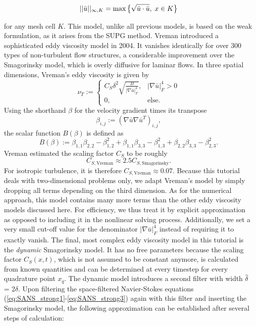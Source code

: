 \documentclass[a4paper, 11pt, twoside]{article}
\begin{document}
\begin{equation}
    ||\bar{u}||_{\infty,K} = \max\big\{\sqrt{\bar{u} \cdot \bar{u}}, \hspace{0.1cm} x \in K\big\}
\end{equation} 

for any mesh cell $K$. This model, unlike all previous models, is based on the weak formulation, as it arises from the SUPG method. Vreman \cite{Vreman} introduced a sophisticated eddy viscosity model in 2004. It vanishes identically for over 300 types of non-turbulent flow structures, a considerable improvement over the Smagorinsky model, which is overly diffusive for laminar flows. In three spatial dimensions, Vreman's eddy viscosity is given by \begin{equation}
    \label{eq:Vreman}
    \nu_T := \begin{cases}
    C_S \delta^2 \sqrt{\frac{B}{|\nabla \bar{u}|_F^4}}, & |\nabla \bar{u}|_F^4 > 0 \\
    0, & \text{else}.
    \end{cases}
\end{equation} Using the shorthand $\beta$ for the velocity gradient times its transpose \begin{equation}
    \beta_{i,j} := (\nabla \bar{u} \nabla \bar{u}^T)_{i,j}, 
\end{equation} the scalar function $B(\beta)$ is defined as \begin{equation}
    B(\beta) := \beta_{1,1}\beta_{2,2} - \beta_{1,2}^2 + \beta_{1,1}\beta_{3,3} - \beta_{1,3}^2 + \beta_{2,2}\beta_{3,3} - \beta_{2,3}^2.
\end{equation} Vreman estimated the scaling factor $C_S$ to be roughly \begin{equation}
    C_{S, \text{Vreman}} \approx 2.5 C_{S, \text{Smagorinsky}}.
\end{equation} For isotropic turbulence, it is therefore $C_{S, \text{Vreman}} \approx 0.07$. Because this tutorial deals with two-dimensional problems only, we adapt Vreman's model by simply dropping all terms depending on the third dimension. As for the numerical approach, this model contains many more terms than the other eddy viscosity models discussed here. For efficiency, we thus treat it by explicit approximation as opposed to including it in the nonlinear solving process. Additionally, we set a very small cut-off value for the denominator $|\nabla \bar{u}|_F^4$ instead of requiring it to exactly vanish. The final, most complex eddy viscosity model in this tutorial is the \textit{dynamic} Smagorinsky model. It has no free parameters because the scaling factor $C_S(x,t)$, which is not assumed to be constant anymore, is calculated from known quantities and can be determined at every timestep for every quadrature point $x_q$. The dynamic model introduces a second filter with width $\hat{\delta}$ = 2$\delta$. Upon filtering the space-filtered Navier-Stokes equations (\ref{eq:SANS_strong1}-\ref{eq:SANS_strong3}) again with this filter and inserting the Smagorinsky model, the following approximation can be established after several steps of calculation: 
\end{document}

